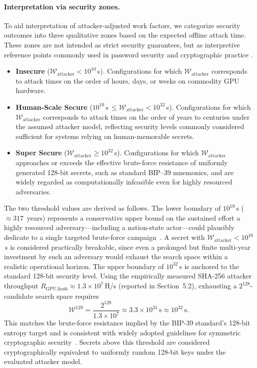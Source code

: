 \documentclass[journal,article,accept,pdftex,moreauthors]{Definitions/mdpi}
\begin{document}
\paragraph{Interpretation via security zones.}
To aid interpretation of attacker-adjusted work factors, we categorize security outcomes into three qualitative zones based on the expected offline attack time. These zones are not intended as strict security guarantees, but as interpretive reference points commonly used in password security and cryptographic practice \cite{Bonneau2012a}.
\begin{itemize}
\item \textbf{Insecure} ($\mathcal{W}_{\text{attacker}} < 10^{10}$\,s). Configurations for which $\mathcal{W}_{\text{attacker}}$ corresponds to attack times on the order of hours, days, or weeks on commodity GPU hardware.
\item \textbf{Human-Scale Secure} ($10^{10}$\,s\,$\le \mathcal{W}_{\text{attacker}} < 10^{32}$\,s). Configurations for which $\mathcal{W}_{\text{attacker}}$ corresponds to attack times on the order of years to centuries under the assumed attacker model, reflecting security levels commonly considered sufficient for systems relying on human-memorable secrets.
\item \textbf{Super Secure} ($\mathcal{W}_{\text{attacker}} \ge 10^{32}$\,s). Configurations for which $\mathcal{W}_{\text{attacker}}$ approaches or exceeds the effective brute-force resistance of uniformly generated 128-bit secrets, such as standard BIP--39 mnemonics, and are widely regarded as computationally infeasible even for highly resourced adversaries.
\end{itemize}

The two threshold values are derived as follows. The lower boundary of $10^{10}$\,s ($\approx 317$~years) represents a conservative upper bound on the sustained effort a highly resourced adversary---including a nation-state actor---could plausibly dedicate to a single targeted brute-force campaign~\cite{Bonneau2012a}. A secret with $\mathcal{W}_{\text{attacker}} < 10^{10}$\,s is considered practically breakable, since even a prolonged but finite multi-year investment by such an adversary would exhaust the search space within a realistic operational horizon. The upper boundary of $10^{32}$\,s is anchored to the standard 128-bit security level. Using the empirically measured SHA-256 attacker throughput $R_{\text{GPU,hash}} \approx 1.3 \times 10^{7}$\,H/s (reported in Section~5.2), exhausting a $2^{128}$-candidate search space requires
\begin{equation}
\mathcal{W}^{128} = \frac{2^{128}}{1.3 \times 10^{7}} \approx 3.3 \times 10^{31}\,\text{s} \approx 10^{32}\,\text{s}.
\label{eq:w128_threshold}
\end{equation}
This matches the brute-force resistance implied by the BIP-39 standard's 128-bit entropy target and is consistent with widely adopted guidelines for symmetric cryptographic security~\cite{Bonneau2012a}. Secrets above this threshold are considered cryptographically equivalent to uniformly random 128-bit keys under the evaluated attacker model.
\end{document}
